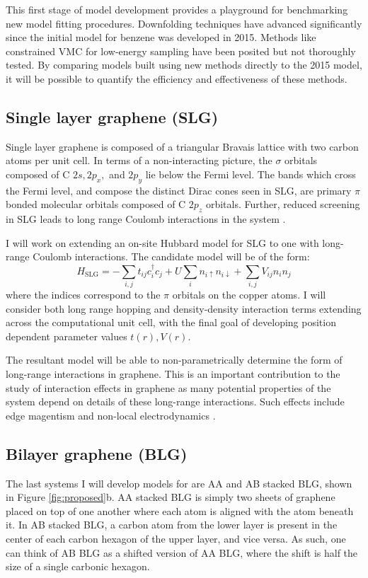 \documentclass[12pt]{article}
\begin{document}
This first stage of model development provides a playground for benchmarking new model fitting procedures.
Downfolding techniques have advanced significantly since the initial model for benzene was developed in 2015.
Methods like constrained VMC for low-energy sampling have been posited but not thoroughly tested.
By comparing models built using new methods directly to the 2015 model, it will be possible to quantify the efficiency and effectiveness of these methods.

\subsection{Single layer graphene (SLG)}
Single layer graphene is composed of a triangular Bravais lattice with two carbon atoms per unit cell.
In terms of a non-interacting picture, the $\sigma$ orbitals composed of C $2s, 2p_x,$ and $2p_y$ lie below the Fermi level.
The bands which cross the Fermi level, and compose the distinct Dirac cones seen in SLG, are primary $\pi$ bonded molecular orbitals composed of C $2p_z$ orbitals.
Further, reduced screening in SLG leads to long range Coulomb interactions in the system \cite{Elias2012, Yu2013}.

I will work on extending an on-site Hubbard model for SLG \cite{Zheng2017, Wagner2015} to one with long-range Coulomb interactions.
The candidate model will be of the form:
\begin{equation}
H_\text{SLG} = -\sum_{i,j} t_{ij}c_i^\dagger c_j + U \sum_i n_{i\uparrow}n_{i\downarrow}  + \sum_{i,j} V_{ij} n_i n_j
\label{Hslg}
\end{equation}
where the indices correspond to the $\pi$ orbitals on the copper atoms.
I will consider both long range hopping and density-density interaction terms extending across the computational unit cell, with the final goal of developing position dependent parameter values $t(r), V(r)$.

The resultant model will be able to non-parametrically determine the form
of long-range interactions in graphene.
This is an important contribution to the study of interaction effects in graphene as many potential properties of the system depend on details of these long-range interactions.
Such effects include edge magentism \cite{PhysRevB.95.195420} and non-local electrodynamics \cite{PhysRevB.90.045137}.

\subsection{Bilayer graphene (BLG)}
The last systems I will develop models for are AA and AB stacked BLG, shown in Figure \ref{fig:proposed}b.
AA stacked BLG is simply two sheets of graphene placed on top of one another where each atom is aligned with the atom beneath it.
In AB stacked BLG, a carbon atom from the lower layer is present in the center of each carbon hexagon of the upper layer, and vice versa.
As such, one can think of AB BLG as a shifted version of AA BLG, where the shift is half the size of a single carbonic hexagon.
\end{document}
